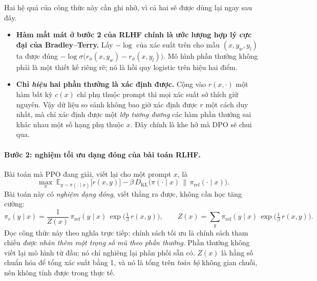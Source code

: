 Hai hệ quả của công thức này cần ghi nhớ, vì cả hai sẽ được dùng lại ngay sau đây.
\begin{itemize}
    \item \textbf{Hàm mất mát ở bước 2 của RLHF chính là ước lượng hợp lý cực đại của Bradley--Terry.} Lấy \( -\log \) của xác suất trên cho mẫu \( (x, y_w, y_l) \) ta được đúng \( -\log\sigma\big(r_\phi(x,y_w) - r_\phi(x,y_l)\big) \). Mô hình phần thưởng không phải là một thiết kế riêng rẽ; nó là hồi quy logistic trên hiệu hai điểm.
    \item \textbf{Chỉ \emph{hiệu} hai phần thưởng là xác định được.} Cộng vào \( r(x,\cdot) \) một hàm bất kỳ \( c(x) \) chỉ phụ thuộc prompt thì mọi xác suất sở thích giữ nguyên. Vậy dữ liệu so sánh không bao giờ xác định được \( r \) một cách duy nhất, mà chỉ xác định được một \emph{lớp tương đương} các hàm phần thưởng sai khác nhau một số hạng phụ thuộc \( x \). Đây chính là khe hở mà DPO sẽ chui qua.
\end{itemize}

\paragraph{Bước 2: nghiệm tối ưu dạng đóng của bài toán RLHF.}
Bài toán mà PPO đang giải, viết lại cho một prompt \( x \), là
\[
    \max_{\pi}\;
    \mathbb{E}_{y \sim \pi(\cdot \mid x)}\big[ r(x,y) \big]
    - \beta\, D_{\text{KL}}\big(\pi(\cdot \mid x) \,\big\|\, \pi_{\text{ref}}(\cdot \mid x)\big).
\]
Bài toán này có \emph{nghiệm dạng đóng}, viết thẳng ra được, không cần học tăng cường:
\[
    \pi_r(y \mid x) = \frac{1}{Z(x)}\, \pi_{\text{ref}}(y \mid x)\,
    \exp\!\Big( \tfrac{1}{\beta}\, r(x,y) \Big),
    \qquad
    Z(x) = \sum_{y} \pi_{\text{ref}}(y \mid x)\, \exp\!\Big( \tfrac{1}{\beta}\, r(x,y) \Big).
\]
Đọc công thức này theo nghĩa trực tiếp: chính sách tối ưu là chính sách tham chiếu \emph{được nhân thêm một trọng số mũ theo phần thưởng}. Phần thưởng không viết lại mô hình từ đầu; nó chỉ nghiêng lại phân phối sẵn có. \( Z(x) \) là hằng số chuẩn hóa để tổng xác suất bằng 1, và nó là tổng trên \emph{toàn bộ} không gian chuỗi, nên không tính được trong thực tế.

